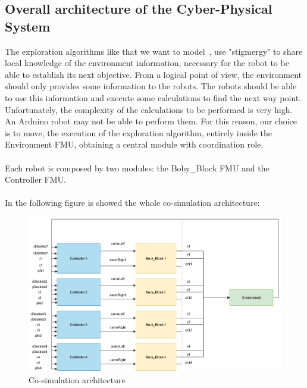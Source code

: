 \documentclass[english]{article}
\begin{document}
\subsection{Overall architecture of the Cyber-Physical System}
\label{Overall architecture of the Cyber-Physical System}
The exploration algorithms like that we want to model~\cite{AlgorithmPaper}, use "stigmergy" to share local knowledge of the environment information, necessary for the robot to be able to establish its next objective. From a logical point of view, the environment should only provides some information to the robots. The robots should be able to use this information and execute some calculations to find the next way point. Unfortunately, the complexity of the calculations to be performed is very high. An Arduino robot may not be able to perform them. For this reason, our choice is to move, the execution of the exploration algorithm, entirely inside the Environment FMU, obtaining a central module with coordination role.\\
\\Each robot is composed by two modules: the Boby\_Block FMU and the Controller FMU.\\
\\In the following figure is showed the whole co-simulation architecture:

\begin{figure} [h]
	\centering
	\includegraphics[width=0.7\linewidth]{figures/architecture.png}
	\caption{Co-simulation architecture}
	\label{fig:architecture}
\end{figure}
\end{document}
